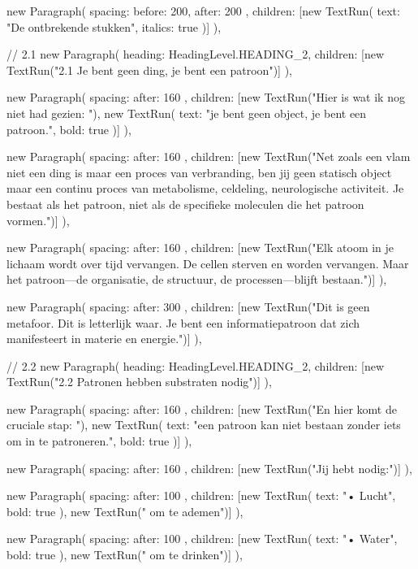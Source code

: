 {{      new Paragraph({
        spacing: { before: 200, after: 200 },
        children: [new TextRun({ text: "De ontbrekende stukken", italics: true })]
      }),

      // 2.1
      new Paragraph({
        heading: HeadingLevel.HEADING_2,
        children: [new TextRun("2.1 Je bent geen ding, je bent een patroon")]
      }),

      new Paragraph({
        spacing: { after: 160 },
        children: [new TextRun("Hier is wat ik nog niet had gezien: "), new TextRun({ text: "je bent geen object, je bent een patroon.", bold: true })]
      }),

      new Paragraph({
        spacing: { after: 160 },
        children: [new TextRun("Net zoals een vlam niet een ding is maar een proces van verbranding, ben jij geen statisch object maar een continu proces van metabolisme, celdeling, neurologische activiteit. Je bestaat als het patroon, niet als de specifieke moleculen die het patroon vormen.")]
      }),

      new Paragraph({
        spacing: { after: 160 },
        children: [new TextRun("Elk atoom in je lichaam wordt over tijd vervangen. De cellen sterven en worden vervangen. Maar het patroon—de organisatie, de structuur, de processen—blijft bestaan.")]
      }),

      new Paragraph({
        spacing: { after: 300 },
        children: [new TextRun("Dit is geen metafoor. Dit is letterlijk waar. Je bent een informatiepatroon dat zich manifesteert in materie en energie.")]
      }),

      // 2.2
      new Paragraph({
        heading: HeadingLevel.HEADING_2,
        children: [new TextRun("2.2 Patronen hebben substraten nodig")]
      }),

      new Paragraph({
        spacing: { after: 160 },
        children: [new TextRun("En hier komt de cruciale stap: "), new TextRun({ text: "een patroon kan niet bestaan zonder iets om in te patroneren.", bold: true })]
      }),

      new Paragraph({
        spacing: { after: 160 },
        children: [new TextRun("Jij hebt nodig:")]
      }),

      new Paragraph({
        spacing: { after: 100 },
        children: [new TextRun({ text: "• Lucht", bold: true }), new TextRun(" om te ademen")]
      }),

      new Paragraph({
        spacing: { after: 100 },
        children: [new TextRun({ text: "• Water", bold: true }), new TextRun(" om te drinken")]
      }),

}}
